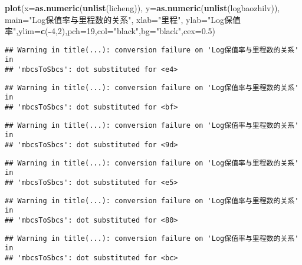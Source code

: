 \documentclass[]{article}
\newenvironment{Shaded}{\begin{snugshade}}{\end{snugshade}}
\newcommand{\KeywordTok}[1]{\textcolor[rgb]{0.13,0.29,0.53}{\textbf{#1}}}
\newcommand{\DataTypeTok}[1]{\textcolor[rgb]{0.13,0.29,0.53}{#1}}
\newcommand{\DecValTok}[1]{\textcolor[rgb]{0.00,0.00,0.81}{#1}}
\newcommand{\FloatTok}[1]{\textcolor[rgb]{0.00,0.00,0.81}{#1}}
\newcommand{\StringTok}[1]{\textcolor[rgb]{0.31,0.60,0.02}{#1}}
\newcommand{\OperatorTok}[1]{\textcolor[rgb]{0.81,0.36,0.00}{\textbf{#1}}}
\newcommand{\NormalTok}[1]{#1}
\begin{document}
\begin{Shaded}
\begin{Highlighting}[]
\KeywordTok{plot}\NormalTok{(}\DataTypeTok{x=}\KeywordTok{as.numeric}\NormalTok{(}\KeywordTok{unlist}\NormalTok{(licheng)), }\DataTypeTok{y=}\KeywordTok{as.numeric}\NormalTok{(}\KeywordTok{unlist}\NormalTok{(logbaozhilv)), }\DataTypeTok{main=}\StringTok{"Log保值率与里程数的关系"}\NormalTok{, }\DataTypeTok{xlab=}\StringTok{"里程"}\NormalTok{, }\DataTypeTok{ylab=}\StringTok{"Log保值率"}\NormalTok{,}\DataTypeTok{ylim=}\KeywordTok{c}\NormalTok{(}\OperatorTok{-}\DecValTok{4}\NormalTok{,}\DecValTok{2}\NormalTok{),}\DataTypeTok{pch=}\DecValTok{19}\NormalTok{,}\DataTypeTok{col=}\StringTok{"black"}\NormalTok{,}\DataTypeTok{bg=}\StringTok{"black"}\NormalTok{,}\DataTypeTok{cex=}\FloatTok{0.5}\NormalTok{)}
\end{Highlighting}
\end{Shaded}

\begin{verbatim}
## Warning in title(...): conversion failure on 'Log保值率与里程数的关系' in
## 'mbcsToSbcs': dot substituted for <e4>
\end{verbatim}

\begin{verbatim}
## Warning in title(...): conversion failure on 'Log保值率与里程数的关系' in
## 'mbcsToSbcs': dot substituted for <bf>
\end{verbatim}

\begin{verbatim}
## Warning in title(...): conversion failure on 'Log保值率与里程数的关系' in
## 'mbcsToSbcs': dot substituted for <9d>
\end{verbatim}

\begin{verbatim}
## Warning in title(...): conversion failure on 'Log保值率与里程数的关系' in
## 'mbcsToSbcs': dot substituted for <e5>
\end{verbatim}

\begin{verbatim}
## Warning in title(...): conversion failure on 'Log保值率与里程数的关系' in
## 'mbcsToSbcs': dot substituted for <80>
\end{verbatim}

\begin{verbatim}
## Warning in title(...): conversion failure on 'Log保值率与里程数的关系' in
## 'mbcsToSbcs': dot substituted for <bc>
\end{verbatim}
\end{document}

